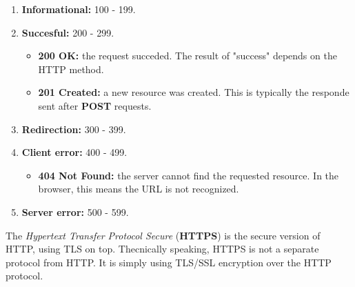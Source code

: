 \begin{enumerate}
  \item \textbf{Informational:} 100 - 199.
  \item \textbf{Succesful:} 200 - 299.
    \begin{itemize}
      \item \textbf{200 OK:} the request succeded. The result of "success" depends on the HTTP method.
      \item \textbf{201 Created:} a new resource was created. This is typically the responde sent after \textbf{POST} requests.
    \end{itemize}
  \item \textbf{Redirection:} 300 - 399.
  \item \textbf{Client error:} 400 - 499.
    \begin{itemize}
      \item \textbf{404 Not Found:} the server cannot find the requested resource. In the browser, this means the URL is not recognized.
    \end{itemize}
  \item \textbf{Server error:} 500 - 599.
\end{enumerate}

The \textit{Hypertext Transfer Protocol Secure} (\textbf{HTTPS}) is the secure version of HTTP, using TLS on top. Thecnically speaking, HTTPS is not a separate protocol from HTTP. It is simply using TLS/SSL encryption over the HTTP protocol.
